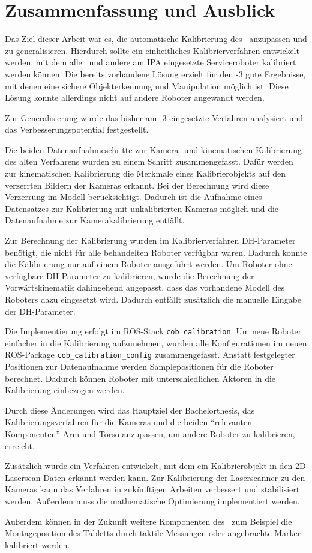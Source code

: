 \chapter{Zusammenfassung und Ausblick}

Das Ziel dieser Arbeit war es, die automatische Kalibrierung des \cob\ anzupassen 
und zu generalisieren. Hierdurch sollte ein einheitliches Kalibrierverfahren 
entwickelt werden, mit dem alle \cob\ und andere am \ac{IPA} eingesetzte 
Serviceroboter kalibriert werden können. Die bereits vorhandene Lösung erzielt für
den -3 gute Ergebnisse, mit denen eine sichere Objekterkennung und
Manipulation möglich ist.
Diese Lösung konnte allerdings nicht auf andere Roboter angewandt werden.

Zur Generalisierung wurde das bisher am -3 eingesetzte Verfahren analysiert
und das Verbesserungspotential festgestellt.

Die beiden Datenaufnahmeschritte zur Kamera- und kinematischen Kalibrierung  
des alten Verfahrens wurden zu einem Schritt zusammengefasst.
Dafür werden zur 
kinematischen Kalibrierung die Merkmale eines Kalibrierobjekts auf den
verzerrten Bildern der Kameras erkannt. Bei der Berechnung wird diese
Verzerrung im Modell berücksichtigt.
Dadurch ist die Aufnahme eines Datensatzes zur Kalibrierung mit unkalibrierten
Kameras möglich und die Datenaufnahme zur Kamerakalibrierung entfällt. 

Zur Berechnung der Kalibrierung wurden im Kalibrierverfahren \ac{DH-Parameter}
benötigt, die nicht für alle behandelten Roboter verfügbar waren. Dadurch 
konnte die Kalibrierung nur auf einem Roboter ausgeführt werden.
Um Roboter ohne verfügbare \ac{DH-Parameter} zu kalibrieren, wurde die Berechnung
der Vorwärtskinematik dahingehend angepasst, dass das vorhandene Modell des 
Roboters dazu eingesetzt wird. Dadurch entfällt zusätzlich die manuelle Eingabe der 
\ac{DH-Parameter}.

Die Implementierung erfolgt im \ac{ROS}-Stack \texttt{cob\_calibration}.
Um neue Roboter einfacher in die Kalibrierung aufzunehmen, wurden alle
Konfigurationen im neuen \ac{ROS}-Package \texttt{cob\_calibration\_config}
zusammengefasst.
Anstatt festgelegter Positionen zur Datenaufnahme werden Samplepositionen für
die Roboter berechnet.  
Dadurch können Roboter mit unterschiedlichen Aktoren in die Kalibrierung einbezogen 
werden.


Durch diese Änderungen wird das Hauptziel der Bachelorthesis, das
Kalibrierungsverfahren für die Kameras und die beiden "`relevanten 
Komponenten"'\cite{Haug2012} Arm und Torso anzupassen, um andere Roboter
zu kalibrieren, erreicht.

Zusätzlich wurde ein Verfahren entwickelt, mit dem ein Kalibrierobjekt in den 
2D Laserscan Daten erkannt werden kann. Zur Kalibrierung der Laserscanner zu 
den Kameras kann das Verfahren in zukünftigen Arbeiten verbessert und stabilisiert
werden. Außerdem muss die mathematische Optimierung implementiert werden.

Außerdem können in der Zukunft weitere Komponenten des \cob\ zum Beispiel die Montageposition 
des Tabletts durch taktile Messungen oder angebrachte Marker kalibriert werden.

